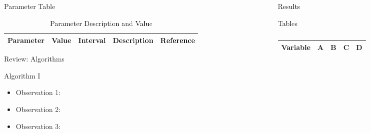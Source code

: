 \begin{frame}[t]
\begin{columns}[t]
\begin{column}{\onecolwid}
\begin{alertblock}{Parameter Table}
\vspace{4pt}
\centering
\begin{table}[h]\footnotesize
	\caption{Parameter Description and Value}
	\begin{tabular}{rllp{2cm}l}
		\hline	
		Parameter & Value & Interval & Description & Reference \\
		\hline 
	\end{tabular}	
\end{table}

\end{alertblock}
\begin{alertblock}{Review: Algorithms}
\begin{algorithm}[H]
	\begin{algorithmic}[1]
	\end{algorithmic}
\caption{Algorithm I}
\label{Algorithm_1}
\end{algorithm}
\begin{itemize}
	\item Observation 1: \\
	\item Observation 2:  \\
	\item Observation 3:  \\
\end{itemize}	
\end{alertblock}
\end{column}
\begin{column}{\onecolwid} %
\begin{alertblock}{Results}
\end{alertblock}
\begin{alertblock}{Tables}

\vspace{4pt}
\centering
\begin{table}[h]\footnotesize
	\caption{}
	\begin{tabular}{rllp{2cm}l}
		\hline	
		Variable & A & B & C & D \\
		\hline 
	\end{tabular}	
\end{table}


\end{alertblock}
\end{column}
\end{columns}
\end{frame}
